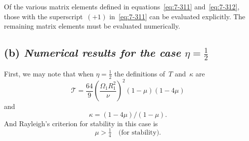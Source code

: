 Of the various matrix elements defined in equations~\eqref{eq:7-311} and~\eqref{eq:7-312},
those with the superscript~$(+1)$ in~\eqref{eq:7-311} can be evaluated explicitly.
The remaining matrix elements must be evaluated numerically.

\subsection*{(b) \textit{Numerical results for the case} $\eta = \frac{1}{2}$}

First, we may note that when $\eta = \frac{1}{2}$ the definitions of~$T$ and~$\kappa$ are
\begin{equation}
\label{eq:7-314}
\mathscr{T} = \frac{64}{9}\!\left(\frac{\Omega_1 R_1^2}{\nu}\right)^{\!2}
  (1-\mu)(1-4\mu)
\end{equation}
and
\begin{equation}
\label{eq:7-315}
\kappa = (1-4\mu)/(1-\mu).
\end{equation}
And Rayleigh's criterion for stability in this case is
\begin{equation}
\label{eq:7-316}
\mu > \tfrac{1}{4} \quad \text{(for stability).}
\end{equation}

